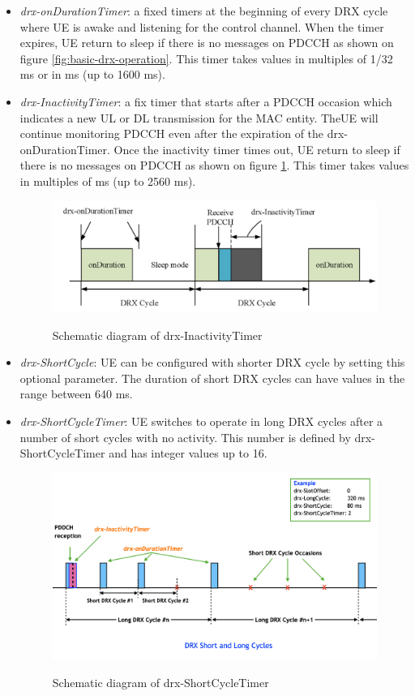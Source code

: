 \documentclass[conference]{IEEEtran}
\begin{document}
\begin{itemize}
    \item \textit{drx-onDurationTimer}: a fixed timers at the beginning of every DRX cycle where UE is awake and listening for the control channel. When the timer expires, UE return to sleep if there is no messages on PDCCH as shown on figure \ref{fig:basic-drx-operation}. This timer takes values in multiples of 1/32 ms or in ms (up to 1600 ms).
    \item \textit{drx-InactivityTimer}: a fix timer that starts after a PDCCH occasion which indicates a new UL or DL transmission for the MAC entity. TheUE will continue monitoring PDCCH even after the expiration of  the drx-onDurationTimer. Once the inactivity timer times out, UE return to sleep if there is no messages on PDCCH as shown on figure \ref{fig:5g-drx-InactivityTimer}. This timer takes values in multiples of ms (up to 2560 ms).
\begin{figure}
    \centering
    \includegraphics[width=\linewidth]{Pictures/Schematic diagram of drx-InactivityTimer.png}
    \label{fig:5g-drx-InactivityTimer}
    \caption{Schematic diagram of drx-InactivityTimer}
\end{figure}

    \item \textit{drx-ShortCycle}: UE can be configured with shorter DRX cycle by setting this optional parameter. The duration of short DRX cycles can have values in the range between 640 ms.
    
    \item \textit{drx-ShortCycleTimer}: UE switches to operate in long DRX cycles after a number of short cycles with no activity. This number is defined by drx-ShortCycleTimer and has integer values up to 16.
\begin{figure}
    \centering
    \includegraphics[width=\linewidth]{Pictures/Schematic diagram of drx-ShortCycleTimer.png}
    \label{fig:5g-drx-ShortCycleTimer}
    \caption{Schematic diagram of drx-ShortCycleTimer}
\end{figure}


\end{itemize}
\end{document}
